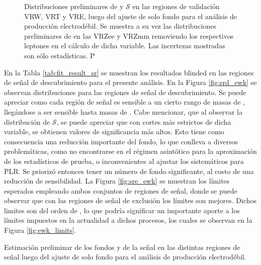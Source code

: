 \begin{figure}
    \caption{Distribuciones preliminares de \met y $\mathcal{S}$ en las regiones de validación VRW, VRT y VRE, luego del ajuste de solo fondo para el análisis de producción electrodébil. Se muestra a su vez las distribuciones preliminares de \met en las VRZee y VRZmm removiendo los respectivos leptones en el cálculo de dicha variable. Las incertezas mostradas son sólo estadísticas. P}
    \label{fig:vr_ewk}

\end{figure}

En la Tabla \ref{tab:fit_result_sr} se muestran los resultados blinded en las regiones de señal de descubrimiento para el presente análisis. En la Figura \ref{fig:srd_ewk} se observan distribuciones para las regiones de señal de descubrimiento. Se puede apreciar como cada región de señal es sensible a un cierto rango de masas de \ninoone, llegándose a ser sensible hasta masas de . Cabe mencionar, que al observar la distribución de $\mathcal{S}$, se puede apreciar que con cortes más estrictos de dicha variable, se obtienen valores de significancia más altos. Esto tiene como consecuencia una reducción importante del fondo, lo que conlleva a diversos problemáticas, como no encontrarse en el régimen asintótico para la aproximación de los estadísticos de prueba, o inconvenientes al ajustar los sistemáticos para PLR. Se priorizó entonces tener un número de fondo significante, al costo de una reducción de sensibilidad.
La Figura \ref{fig:sre_ewk} se muestran los límites esperados empleando ambos conjuntos de regiones de señal, donde se puede observar que con las regiones de señal de exclusión los límites son mejores.
Dichos limites son del orden de , lo que podría significar un importante aporte a los límites impuestos en la actualidad a dichos procesos, los cuales se observan en la Figura \ref{fig:ewk_limits}.


\begin{table}[ht!]
  \centering
  \caption{Estimación preliminar de los fondos y de la señal en las distintas regiones de señal luego del ajuste de solo fondo para el análisis de producción electrodébil.}
  \resizebox{\textwidth}{!}{}
  \label{tab:fit_result_sr}
\end{table}



